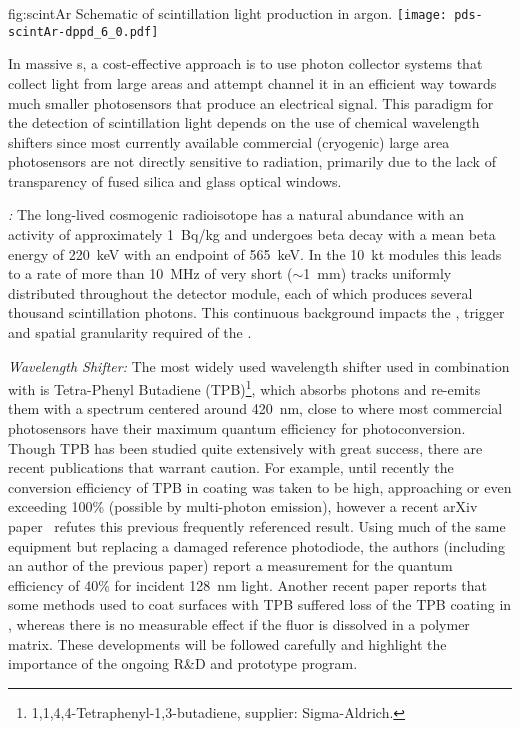 \begin{dunefigure}{fig:scintAr}
{Schematic of scintillation light production in argon.}
\texttt{[image: pds-scintAr-dppd\_6\_0.pdf]}
\end{dunefigure}

In massive \lartpc{}s, a cost-effective approach is to use photon collector systems that collect light from large areas and attempt channel it in an efficient way towards much smaller photosensors that produce an electrical signal.
This paradigm for the detection of \lar scintillation light depends on the use of chemical wavelength shifters since most currently available commercial (cryogenic) large area photosensors are not directly sensitive to  radiation, primarily due to the lack of transparency of fused silica and glass optical windows. 

\emph{:}  The long-lived cosmogenic radioisotope  has a natural abundance with an activity of approximately \SI{1}{Bq/kg} and
undergoes beta decay with a mean beta energy of \SI{220}{keV} with an endpoint of \SI{565}{keV}. In the \SI{10}{kt}  modules this leads to a rate of more than \SI{10}{MHz} of very short ($\sim$\SI{1}{mm}) tracks uniformly distributed throughout the detector module, each of which produces several thousand  scintillation photons. This continuous background impacts the , trigger and spatial granularity required of the .

\emph{Wavelength Shifter:} The most widely used wavelength shifter used in combination with \lar is Tetra-Phenyl Butadiene (TPB)\footnote{1,1,4,4-Tetraphenyl-1,3-butadiene, supplier: Sigma-Aldrich\textregistered.}, which absorbs  photons and re-emits them with a spectrum centered around \SI{420}{nm}, close to where most commercial photosensors have their maximum quantum efficiency for photoconversion. 
Though TPB has been studied quite extensively with great success, there are recent publications that warrant caution. For example, until recently the conversion efficiency of TPB in coating was taken to be high, approaching or even exceeding \num{100}\% (possible by multi-photon emission), however a recent arXiv paper~\cite{Benson:2017vbw} refutes this previous frequently referenced result. Using much of the same equipment but replacing a damaged reference photodiode, the authors (including an author of the previous paper) report a measurement for the quantum efficiency of \num{40}\% for incident \SI{128}{nm} light. 
Another recent paper\cite{Asaadi:2018ixs} reports that some methods used to coat surfaces with TPB suffered loss of the TPB coating in \lar, whereas there is no measurable effect if the fluor is dissolved in a polymer matrix. These developments will be followed carefully and highlight the importance of the ongoing R\&D and prototype program.


